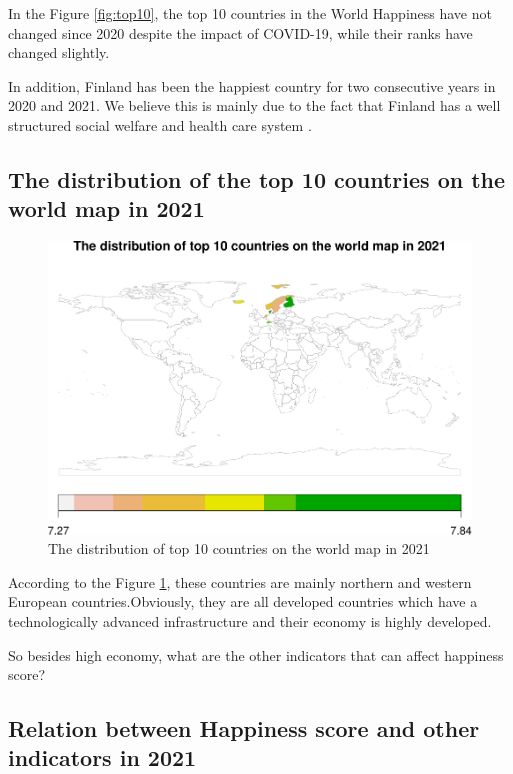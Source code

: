 \documentclass[11pt,a4paper,]{article}
\begin{document}
In the Figure \ref{fig:top10}, the top 10 countries in the World Happiness have not changed since 2020 despite the impact of COVID-19, while their ranks have changed slightly.

In addition, Finland has been the happiest country for two consecutive years in 2020 and 2021. We believe this is mainly due to the fact that Finland has a well structured social welfare and health care system \autocite{lappi2006finland}.

\hypertarget{the-distribution-of-the-top-10-countries-on-the-world-map-in-2021}{%
\subsection{The distribution of the top 10 countries on the world map in 2021}\label{the-distribution-of-the-top-10-countries-on-the-world-map-in-2021}}

\begin{figure}
\centering
\includegraphics{Assignment4_files/figure-latex/top10map-1.pdf}
\caption{\label{fig:top10map}The distribution of top 10 countries on the world map in 2021}
\end{figure}

According to the Figure \ref{fig:top10map}, these countries are mainly northern and western European countries.Obviously, they are all developed countries which have a technologically advanced infrastructure and their economy is highly developed.

So besides high economy, what are the other indicators that can affect happiness score?

\hypertarget{relation-between-happiness-score-and-other-indicators-in-2021}{%
\subsection{Relation between Happiness score and other indicators in 2021}\label{relation-between-happiness-score-and-other-indicators-in-2021}}
\end{document}
